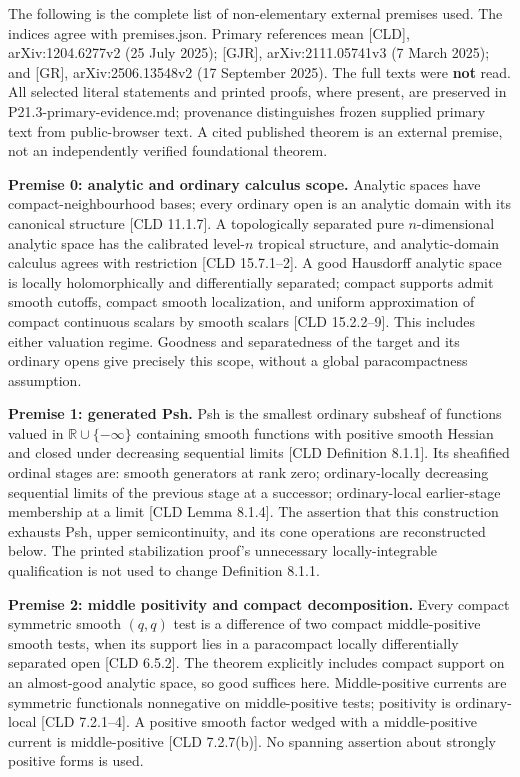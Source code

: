 \documentclass[
  11pt,
]{article}
\begin{document}
The following is the complete list of non-elementary external premises
used. The indices agree with premises.json. Primary references mean
{[}CLD{]}, arXiv:1204.6277v2 (25 July 2025); {[}GJR{]},
arXiv:2111.05741v3 (7 March 2025); and {[}GR{]}, arXiv:2506.13548v2 (17
September 2025). The full texts were \textbf{not} read. All selected
literal statements and printed proofs, where present, are preserved in
P21.3-primary-evidence.md; provenance distinguishes frozen supplied
primary text from public-browser text. A cited published theorem is an
external premise, not an independently verified foundational theorem.

\textbf{Premise 0: analytic and ordinary calculus scope.} Analytic
spaces have compact-neighbourhood bases; every ordinary open is an
analytic domain with its canonical structure {[}CLD 11.1.7{]}. A
topologically separated pure \(n\)-dimensional analytic space has the
calibrated level-\(n\) tropical structure, and analytic-domain calculus
agrees with restriction {[}CLD 15.7.1--2{]}. A good Hausdorff analytic
space is locally holomorphically and differentially separated; compact
supports admit smooth cutoffs, compact smooth localization, and uniform
approximation of compact continuous scalars by smooth scalars {[}CLD
15.2.2--9{]}. This includes either valuation regime. Goodness and
separatedness of the target and its ordinary opens give precisely this
scope, without a global paracompactness assumption.

\textbf{Premise 1: generated Psh.} Psh is the smallest ordinary subsheaf
of functions valued in \(\mathbb R\cup\{-\infty\}\) containing smooth
functions with positive smooth Hessian and closed under decreasing
sequential limits {[}CLD Definition 8.1.1{]}. Its sheafified ordinal
stages are: smooth generators at rank zero; ordinary-locally decreasing
sequential limits of the previous stage at a successor; ordinary-local
earlier-stage membership at a limit {[}CLD Lemma 8.1.4{]}. The assertion
that this construction exhausts Psh, upper semicontinuity, and its cone
operations are reconstructed below. The printed stabilization proof's
unnecessary locally-integrable qualification is not used to change
Definition 8.1.1.

\textbf{Premise 2: middle positivity and compact decomposition.} Every
compact symmetric smooth \((q,q)\) test is a difference of two compact
middle-positive smooth tests, when its support lies in a paracompact
locally differentially separated open {[}CLD 6.5.2{]}. The theorem
explicitly includes compact support on an almost-good analytic space, so
good suffices here. Middle-positive currents are symmetric functionals
nonnegative on middle-positive tests; positivity is ordinary-local
{[}CLD 7.2.1--4{]}. A positive smooth factor wedged with a
middle-positive current is middle-positive {[}CLD 7.2.7(b){]}. No
spanning assertion about strongly positive forms is used.
\end{document}
